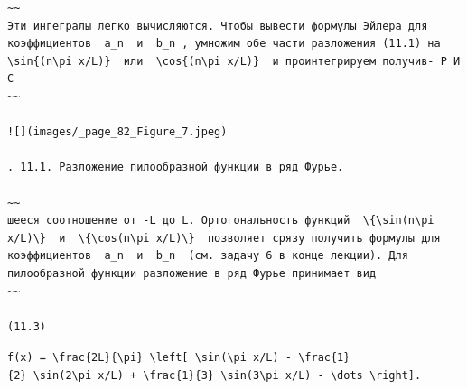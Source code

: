\documentclass[
  ukrainian,
]{article}
\begin{document}
\begin{verbatim}
~~
Эти ингегралы легко вычисляются. Чтобы вывести формулы Эйлера для коэффициентов  a_n  и  b_n , умножим обе части разложения (11.1) на  \sin{(n\pi x/L)}  или  \cos{(n\pi x/L)}  и проинтегрируем получив- Р И С
~~

![](images/_page_82_Figure_7.jpeg)

. 11.1. Разложение пилообразной функции в ряд Фурье.

~~
шееся соотношение от -L до L. Ортогональность функций  \{\sin(n\pi x/L)\}  и  \{\cos(n\pi x/L)\}  позволяет срязу получить формулы для коэффициентов  a_n  и  b_n  (см. задачу 6 в конце лекции). Для пилообразной функции разложение в ряд Фурье принимает вид
~~

(11.3)
\end{verbatim}

\texttt{f(x)\ =\ \textbackslash{}frac\{2L\}\{\textbackslash{}pi\}\ \textbackslash{}left{[}\ \textbackslash{}sin(\textbackslash{}pi\ x/L)\ -\ \textbackslash{}frac\{1\}\{2\}\ \textbackslash{}sin(2\textbackslash{}pi\ x/L)\ +\ \textbackslash{}frac\{1\}\{3\}\ \textbackslash{}sin(3\textbackslash{}pi\ x/L)\ -\ \textbackslash{}dots\ \textbackslash{}right{]}.}
\end{document}
